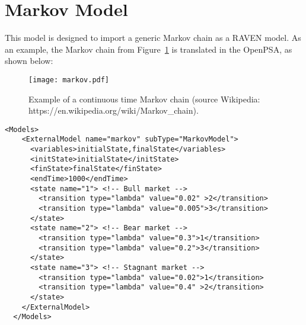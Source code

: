 \section{Markov Model}
\label{sec:MarkovModel}

This model is designed to import a generic Markov chain as a RAVEN model.
As an example, the Markov chain from Figure~\ref{fig:markov} is translated in the OpenPSA, as shown below:

\begin{figure}
    \centering
    \centerline{\texttt{[image: markov.pdf]}}
    \caption{Example of a continuous time Markov chain (source Wikipedia: https://en.wikipedia.org/wiki/Markov\_chain).}
    \label{fig:markov}
\end{figure}

\begin{lstlisting}[style=XML,morekeywords={anAttribute},caption=Markov model input example., label=lst:Markov_InputExample]
  <Models>
    <ExternalModel name="markov" subType="MarkovModel">
      <variables>initialState,finalState</variables>
      <initState>initialState</initState>
      <finState>finalState</finState>
      <endTime>1000</endTime>
      <state name="1"> <!-- Bull market -->
        <transition type="lambda" value="0.02" >2</transition>
        <transition type="lambda" value="0.005">3</transition>
      </state>
      <state name="2"> <!-- Bear market -->
        <transition type="lambda" value="0.3">1</transition>
        <transition type="lambda" value="0.2">3</transition>
      </state>
      <state name="3"> <!-- Stagnant market -->
        <transition type="lambda" value="0.02">1</transition>
        <transition type="lambda" value="0.4" >2</transition>
      </state>
    </ExternalModel>
  </Models>
\end{lstlisting}

